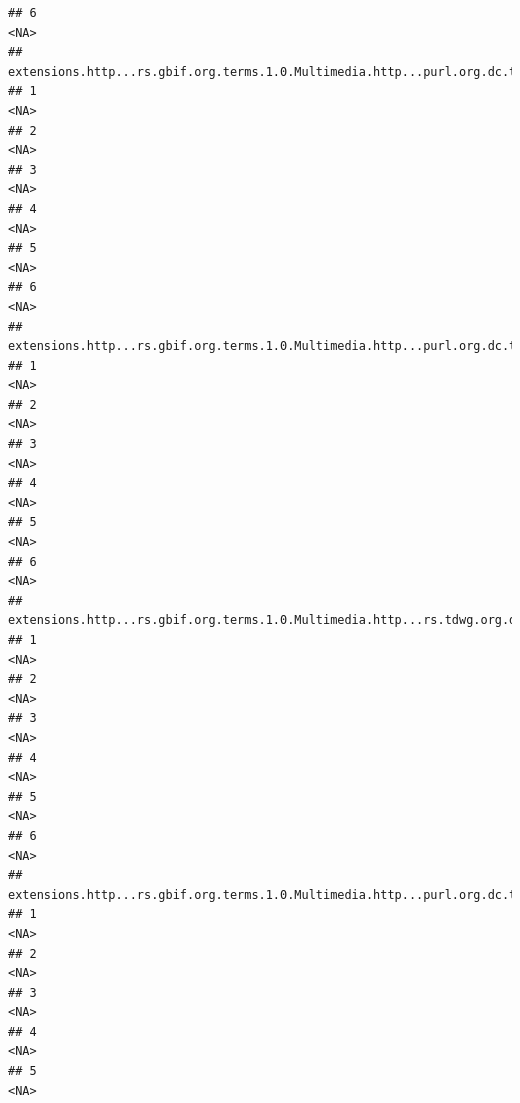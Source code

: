 \documentclass[
]{book}
\begin{document}
\begin{verbatim}
## 6                                                                                       <NA>
##   extensions.http...rs.gbif.org.terms.1.0.Multimedia.http...purl.org.dc.terms.identifier.2
## 1                                                                                     <NA>
## 2                                                                                     <NA>
## 3                                                                                     <NA>
## 4                                                                                     <NA>
## 5                                                                                     <NA>
## 6                                                                                     <NA>
##   extensions.http...rs.gbif.org.terms.1.0.Multimedia.http...purl.org.dc.terms.type.2
## 1                                                                               <NA>
## 2                                                                               <NA>
## 3                                                                               <NA>
## 4                                                                               <NA>
## 5                                                                               <NA>
## 6                                                                               <NA>
##   extensions.http...rs.gbif.org.terms.1.0.Multimedia.http...rs.tdwg.org.dwc.terms.catalogNumber.2
## 1                                                                                            <NA>
## 2                                                                                            <NA>
## 3                                                                                            <NA>
## 4                                                                                            <NA>
## 5                                                                                            <NA>
## 6                                                                                            <NA>
##   extensions.http...rs.gbif.org.terms.1.0.Multimedia.http...purl.org.dc.terms.publisher.2
## 1                                                                                    <NA>
## 2                                                                                    <NA>
## 3                                                                                    <NA>
## 4                                                                                    <NA>
## 5                                                                                    <NA>

\end{verbatim}
\end{document}
